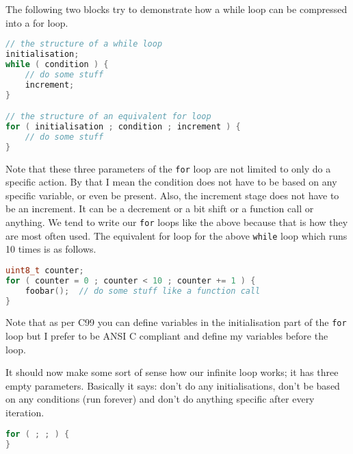 The following two blocks try to demonstrate how a while loop can be compressed into a for loop.

\begin{lstlisting}[language=c]
// the structure of a while loop
initialisation;
while ( condition ) {
    // do some stuff
    increment;
}

// the structure of an equivalent for loop
for ( initialisation ; condition ; increment ) {
    // do some stuff
}
\end{lstlisting}

Note that these three parameters of the \texttt{for} loop are not limited to only do a specific action. By that I mean the condition does not have to be based on any specific variable, or even be present. Also, the increment stage does not have to be an increment. It can be a decrement or a bit shift or a function call or anything.
We tend to write our \texttt{for} loops like the above because that is how they are most often used.
The equivalent for loop for the above \texttt{while} loop which runs 10 times is as follows.

\begin{lstlisting}[language=c]
uint8_t counter;
for ( counter = 0 ; counter < 10 ; counter += 1 ) {
    foobar();  // do some stuff like a function call
}
\end{lstlisting}

Note that as per C99 you can define variables in the initialisation part of the \texttt{for} loop but I prefer to be ANSI C compliant and define my variables before the loop. 

It should now make some sort of sense how our infinite loop works; it has three empty parameters. Basically it says: don't do any initialisations, don't be based on any conditions (run forever) and don't do anything specific after every iteration. 

\begin{lstlisting}[language=c]
for ( ; ; ) {
}
\end{lstlisting}
